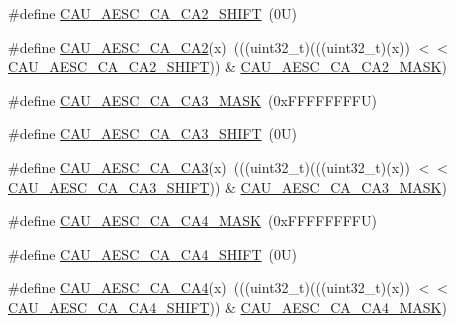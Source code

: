 \begin{DoxyCompactItemize}
\item 
\#define \mbox{\hyperlink{group___c_a_u___register___masks_gafb8c8ffc45b20809178af540f5c15280}{C\+A\+U\+\_\+\+A\+E\+S\+C\+\_\+\+C\+A\+\_\+\+C\+A2\+\_\+\+S\+H\+I\+FT}}~(0\+U)
\item 
\#define \mbox{\hyperlink{group___c_a_u___register___masks_gaf72263318202db500bf3bd7d0caf0b0d}{C\+A\+U\+\_\+\+A\+E\+S\+C\+\_\+\+C\+A\+\_\+\+C\+A2}}(x)~(((uint32\+\_\+t)(((uint32\+\_\+t)(x)) $<$$<$ \mbox{\hyperlink{group___c_a_u___register___masks_gafb8c8ffc45b20809178af540f5c15280}{C\+A\+U\+\_\+\+A\+E\+S\+C\+\_\+\+C\+A\+\_\+\+C\+A2\+\_\+\+S\+H\+I\+FT}})) \& \mbox{\hyperlink{group___c_a_u___register___masks_ga228d26ca32382c1c7fc31336cab80532}{C\+A\+U\+\_\+\+A\+E\+S\+C\+\_\+\+C\+A\+\_\+\+C\+A2\+\_\+\+M\+A\+SK}})
\item 
\#define \mbox{\hyperlink{group___c_a_u___register___masks_ga2acd3c4e0bdc22621d5a9992adcc571e}{C\+A\+U\+\_\+\+A\+E\+S\+C\+\_\+\+C\+A\+\_\+\+C\+A3\+\_\+\+M\+A\+SK}}~(0x\+F\+F\+F\+F\+F\+F\+F\+F\+U)
\item 
\#define \mbox{\hyperlink{group___c_a_u___register___masks_gacb3a23977b7f207a38793d67e7cf5691}{C\+A\+U\+\_\+\+A\+E\+S\+C\+\_\+\+C\+A\+\_\+\+C\+A3\+\_\+\+S\+H\+I\+FT}}~(0\+U)
\item 
\#define \mbox{\hyperlink{group___c_a_u___register___masks_gad446d55254acab1c4ae07a985e549450}{C\+A\+U\+\_\+\+A\+E\+S\+C\+\_\+\+C\+A\+\_\+\+C\+A3}}(x)~(((uint32\+\_\+t)(((uint32\+\_\+t)(x)) $<$$<$ \mbox{\hyperlink{group___c_a_u___register___masks_gacb3a23977b7f207a38793d67e7cf5691}{C\+A\+U\+\_\+\+A\+E\+S\+C\+\_\+\+C\+A\+\_\+\+C\+A3\+\_\+\+S\+H\+I\+FT}})) \& \mbox{\hyperlink{group___c_a_u___register___masks_ga2acd3c4e0bdc22621d5a9992adcc571e}{C\+A\+U\+\_\+\+A\+E\+S\+C\+\_\+\+C\+A\+\_\+\+C\+A3\+\_\+\+M\+A\+SK}})
\item 
\#define \mbox{\hyperlink{group___c_a_u___register___masks_ga19b50ba9810cc4a1ebd860aba00dd728}{C\+A\+U\+\_\+\+A\+E\+S\+C\+\_\+\+C\+A\+\_\+\+C\+A4\+\_\+\+M\+A\+SK}}~(0x\+F\+F\+F\+F\+F\+F\+F\+F\+U)
\item 
\#define \mbox{\hyperlink{group___c_a_u___register___masks_ga67414b23056892843c13aaed39303c4d}{C\+A\+U\+\_\+\+A\+E\+S\+C\+\_\+\+C\+A\+\_\+\+C\+A4\+\_\+\+S\+H\+I\+FT}}~(0\+U)
\item 
\#define \mbox{\hyperlink{group___c_a_u___register___masks_ga0f48fe60e6b2d475dbe6c67cd0947f5f}{C\+A\+U\+\_\+\+A\+E\+S\+C\+\_\+\+C\+A\+\_\+\+C\+A4}}(x)~(((uint32\+\_\+t)(((uint32\+\_\+t)(x)) $<$$<$ \mbox{\hyperlink{group___c_a_u___register___masks_ga67414b23056892843c13aaed39303c4d}{C\+A\+U\+\_\+\+A\+E\+S\+C\+\_\+\+C\+A\+\_\+\+C\+A4\+\_\+\+S\+H\+I\+FT}})) \& \mbox{\hyperlink{group___c_a_u___register___masks_ga19b50ba9810cc4a1ebd860aba00dd728}{C\+A\+U\+\_\+\+A\+E\+S\+C\+\_\+\+C\+A\+\_\+\+C\+A4\+\_\+\+M\+A\+SK}})
$$
\end{DoxyCompactItemize}
